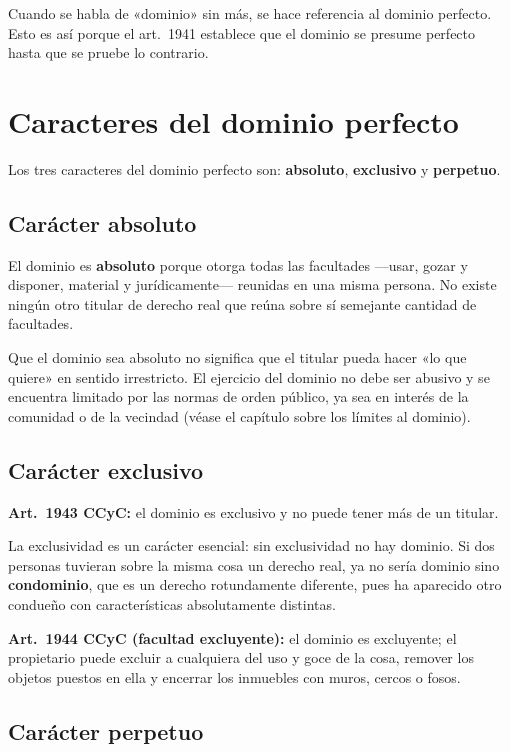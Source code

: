 \documentclass[12pt,oneside]{book}
\begin{document}
\begin{important}
Cuando se habla de «dominio» sin más, se hace referencia al dominio perfecto. Esto es así porque el art.~1941 establece que el dominio se presume perfecto hasta que se pruebe lo contrario.
\end{important}

\section{Caracteres del dominio perfecto}

Los tres caracteres del dominio perfecto son: \textbf{absoluto}, \textbf{exclusivo} y \textbf{perpetuo}.

\subsection{Carácter absoluto}

El dominio es \textbf{absoluto} porque otorga todas las facultades ---usar, gozar y disponer, material y jurídicamente--- reunidas en una misma persona. No existe ningún otro titular de derecho real que reúna sobre sí semejante cantidad de facultades.

Que el dominio sea absoluto no significa que el titular pueda hacer «lo que quiere» en sentido irrestricto. El ejercicio del dominio no debe ser abusivo y se encuentra limitado por las normas de orden público, ya sea en interés de la comunidad o de la vecindad (véase el capítulo sobre los límites al dominio).

\subsection{Carácter exclusivo}

\textbf{Art.~1943 CCyC:} el dominio es exclusivo y no puede tener más de un titular.

La exclusividad es un carácter esencial: sin exclusividad no hay dominio. Si dos personas tuvieran sobre la misma cosa un derecho real, ya no sería dominio sino \textbf{condominio}, que es un derecho rotundamente diferente, pues ha aparecido otro condueño con características absolutamente distintas.

\textbf{Art.~1944 CCyC (facultad excluyente):} el dominio es excluyente; el propietario puede excluir a cualquiera del uso y goce de la cosa, remover los objetos puestos en ella y encerrar los inmuebles con muros, cercos o fosos.

\subsection{Carácter perpetuo}
\end{document}
